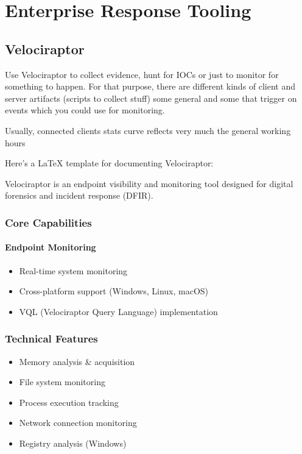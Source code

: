 
\chapter{Enterprise Response Tooling}
\newpage

\section{Velociraptor}
Use Velociraptor to collect evidence, hunt for IOCs or just to monitor for something to happen. For that purpose, there are different kinds of client and server artifacts (scripts to collect stuff) some general and some that trigger on events which you could use for monitoring.

Usually, connected clients stats curve reflects very much the general working hours

Here's a LaTeX template for documenting Velociraptor:

Velociraptor is an endpoint visibility and monitoring tool designed for digital forensics and incident response (DFIR).

\subsection{Core Capabilities}
\subsubsection{Endpoint Monitoring}
\begin{itemize}
    \item Real-time system monitoring
    \item Cross-platform support (Windows, Linux, macOS)
    \item VQL (Velociraptor Query Language) implementation
\end{itemize}

\subsection{Technical Features}
\begin{itemize}
    \item Memory analysis \& acquisition
    \item File system monitoring
    \item Process execution tracking
    \item Network connection monitoring
    \item Registry analysis (Windows)
\end{itemize}

